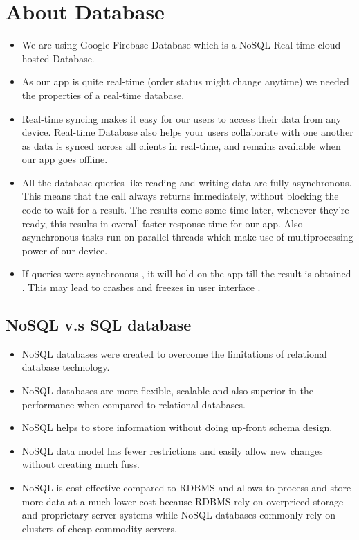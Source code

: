 \documentclass{report}
\begin{document}
\chapter{About Database}

\begin{itemize}
\item We are using Google Firebase Database which is a NoSQL Real-time cloud-hosted Database.
\item As our app is quite real-time (order status might change anytime) we needed the properties of a real-time database.
\item Real-time syncing makes it easy for our users to access their data from any device. Real-time Database also helps your users collaborate with one another as data is synced across all clients in real-time, and remains available when our app goes offline.
\item All the database queries like reading and writing data are fully asynchronous. This means that the call always returns immediately, without blocking the code to wait for a result. The results come some time later, whenever they’re ready, this results in overall faster response time for our app. Also asynchronous tasks run on parallel threads which make use of multiprocessing power of our device.
\item If queries were synchronous , it will hold on the app till the result is obtained . This may lead to crashes and freezes in user interface .   
\end{itemize}

\section{NoSQL v.s SQL database}
\begin{itemize}
\item NoSQL databases were created to overcome the limitations of relational database technology.
\item NoSQL databases are more flexible, scalable and also superior in the performance when compared to relational databases.
\item NoSQL helps to store information without doing up‐front schema design.
\item NoSQL data model has fewer restrictions and easily allow new changes without creating much fuss.
\item NoSQL is cost effective compared to RDBMS and allows to process and store more data at a much lower cost because RDBMS rely on overpriced storage and proprietary server systems while NoSQL databases commonly rely on clusters of cheap commodity servers.
\end{itemize}
\end{document}
